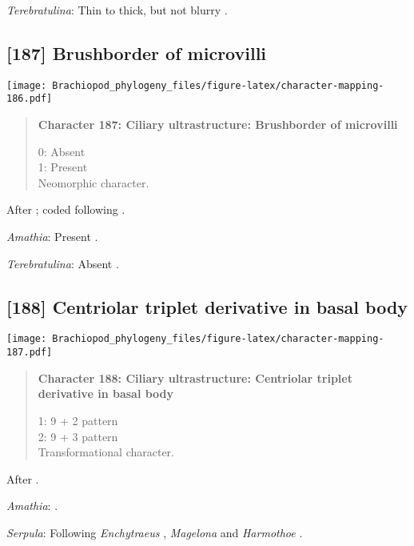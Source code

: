 \documentclass[openany]{book}
\theoremstyle{definition}
\theoremstyle{definition}
\theoremstyle{definition}
\theoremstyle{remark}
\begin{document}
\hypertarget{Terebratulina-coding-186}{}
\emph{Terebratulina}: Thin to thick, but not blurry \citep{Luter1995}.

\subsection*{{[}187{]} Brushborder of
microvilli}\label{brushborder-of-microvilli}

\texttt{[image: Brachiopod\_phylogeny\_files/figure-latex/character-mapping-186.pdf]}

\begin{quote}
\textbf{Character 187: Ciliary ultrastructure: Brushborder of
microvilli}

0: Absent\\
1: Present\\
Neomorphic character.
\end{quote}

After \citet{Lundin2009}; coded following \citet{Smith2012}.

\hypertarget{Amathia-coding-187}{}
\emph{Amathia}: Present \citep{Reed1982}.

\hypertarget{Terebratulina-coding-187}{}
\emph{Terebratulina}: Absent \citep{Luter1995}.

\subsection*{{[}188{]} Centriolar triplet derivative in basal
body}\label{centriolar-triplet-derivative-in-basal-body}

\texttt{[image: Brachiopod\_phylogeny\_files/figure-latex/character-mapping-187.pdf]}

\begin{quote}
\textbf{Character 188: Ciliary ultrastructure: Centriolar triplet
derivative in basal body}

1: 9 + 2 pattern\\
2: 9 + 3 pattern\\
Transformational character.
\end{quote}

After \citet{Lundin2009}.

\hypertarget{Amathia-coding-188}{}
\emph{Amathia}: \citet{Reed1982}.

\hypertarget{Serpula-coding-188}{}
\emph{Serpula}: Following \emph{Enchytraeus} \citep{Reger1967},
\emph{Magelona} \citep{Bartolomaeus1995} and \emph{Harmothoe}
\citep{Holborow1969}.
\end{document}
